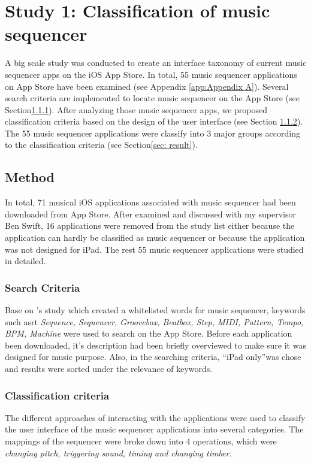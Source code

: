 \chapter{Study 1: Classification of music sequencer}
\label{ch: chapter 3}

A big scale study was conducted to create an interface taxonomy of current music sequencer apps on the iOS App Store. In total, 55 music sequencer applications on App Store have been examined (see Appendix \ref{app:Appendix A}). Several search criteria are implemented to locate music sequencer on the App Store (see Section\ref{subsec: search criteria}). After analyzing those music sequencer apps, we proposed classification criteria based on the design of the user interface (see Section \ref{sec: classify criteria}). The 55 music sequencer applications were classify into 3 major groups according to the classification criteria (see Section\ref{sec: result}).

\section{Method}
\label{sec:method}

In total, 71 musical iOS applications associated with music sequencer had been downloaded from App Store. After examined and discussed with my supervisor Ben Swift, 16 applications were removed from the study list either because the application can hardly be classified as music sequencer or because the application was not designed for iPad. The rest 55 music sequencer applications were studied in detailed.

\subsection{Search Criteria}
\label{subsec: search criteria}

Base on \citeauthor{Reference13}'s study which created a whitelisted words for music sequencer, keywords such asrt \textit{Sequence, Sequencer, Groovebox, Beatbox, Step, MIDI, Pattern, Tempo, BPM, Machine} were used to search on the App Store. Before each application been downloaded, it's description had been briefly overviewed to make sure it was designed for music purpose. Also, in the searching criteria, \textquotedblleft{iPad only}\textquotedblright was chose and results were sorted under the relevance of keywords.

\subsection{Classification criteria}
\label{sec: classify criteria}
The different approaches of interacting with the applications were used to classify the user interface of the music sequencer applications into several categories. The mappings of the sequencer were broke down into 4 operations,
which were \textit{changing pitch, triggering sound, timing and changing timber}.

